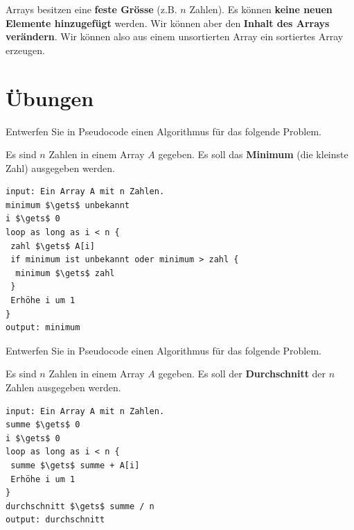 \begin{important}
Arrays besitzen eine \textbf{feste Grösse} (z.B. $n$ Zahlen). Es können \textbf{keine neuen Elemente hinzugefügt} werden.  Wir können aber den \textbf{Inhalt des Arrays verändern}. Wir können also aus einem unsortierten Array ein sortiertes Array erzeugen.
\end{important}

\section{Übungen}

\begin{exercise}
Entwerfen Sie in Pseudocode einen Algorithmus für das folgende Problem.

\begin{problem}\label{problem-minimum-n-zahlen}
Es sind $n$ Zahlen in einem Array $A$ gegeben. Es soll das \textbf{Minimum} (die kleinste Zahl) ausgegeben werden.
\end{problem}

\end{exercise}
\begin{solution}
\begin{minipage}{\linewidth}
\begin{lstlisting}[language=pseudocode, caption={Algorithmus für das Problem \protect\autoref{problem-minimum-n-zahlen}}, label={lst-algo-minimum-n-zahlen}]
input: Ein Array A mit n Zahlen.
minimum $\gets$ unbekannt
i $\gets$ 0
loop as long as i < n {
 zahl $\gets$ A[i]
 if minimum ist unbekannt oder minimum > zahl {
  minimum $\gets$ zahl
 }
 Erhöhe i um 1
}
output: minimum
\end{lstlisting}
\end{minipage}
\end{solution}

\newpage

\begin{exercise}
Entwerfen Sie in Pseudocode einen Algorithmus für das folgende Problem.

\begin{problem}\label{problem-durchschnitt-n-zahlen}
Es sind $n$ Zahlen in einem Array $A$ gegeben. Es soll der \textbf{Durchschnitt} der $n$ Zahlen ausgegeben werden.
\end{problem}

\fillwithgrid	{3.5in}
\end{exercise}
\begin{solution}
\begin{minipage}{\linewidth}
\begin{lstlisting}[language=pseudocode, caption={Algorithmus für das Problem \protect\autoref{problem-durchschnitt-n-zahlen}}, label={lst-algo-durchschnitt-n-zahlen}]
input: Ein Array A mit n Zahlen.
summe $\gets$ 0
i $\gets$ 0
loop as long as i < n {
 summe $\gets$ summe + A[i]
 Erhöhe i um 1
}
durchschnitt $\gets$ summe / n
output: durchschnitt
\end{lstlisting}
\end{minipage}
\end{solution}

